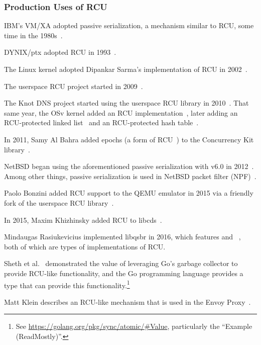 \subsubsection{Production Uses of RCU}
\label{sec:defer:Production Uses of RCU}

IBM's VM/XA adopted passive serialization, a mechanism similar to
RCU, some time in the 1980s~\cite{Hennessy89}.

DYNIX/ptx adopted RCU in 1993~\cite{McKenney98,Slingwine95}.

The Linux kernel adopted Dipankar Sarma's implementation of RCU in
2002~\cite{Torvalds2.5.43}.

The userspace RCU project started in 2009~\cite{MathieuDesnoyers2009URCU}.

The Knot DNS project started using the userspace RCU
library in 2010~\cite{LubosSlovak2010KnotDNSRCU}.
That same year, the OSv kernel added an RCU
implementation~\cite{AviKivity2013OSvRCU},
later adding an RCU-protected linked list~\cite{AviKivity2013OSvRCUlist}
and an RCU-protected hash table~\cite{AviKivity2013OSvRCUhash}.

In 2011, Samy Al Bahra added epochs
(a form of RCU~\cite{UCAM-CL-TR-579,KeirFraser2007withoutLocks})
to the Concurrency Kit
library~\cite{SamyAlBahra2011ckEpoch}.

NetBSD began using the aforementioned passive serialization with v6.0 in
2012~\cite{NetBSD2012pserialize}.
Among other things, passive serialization is used in
NetBSD packet filter (NPF)~\cite{MindaugasRasiukevicius2014NPFRCU}.

Paolo Bonzini added RCU support to the QEMU emulator in 2015 via a
friendly fork of the userspace RCU
library~\cite{MikeDay2013RCUqemu,PaoloBonzini2013QEMURCU}.

In 2015, Maxim Khizhinsky added RCU to
libcds~\cite{MaxKhiszinsky2015C++RCU}.

Mindaugas Rasiukevicius implemented libqsbr in 2016, which features
 and ~\cite{MindaugasRasiukevicius2016libqsbr},
both of which are types of implementations of RCU\@.

Sheth et al.~\cite{HarshalSheth2016goRCU}
demonstrated the value of leveraging Go's garbage
collector to provide RCU-like functionality, and
the Go programming language provides a  type that can
provide this functionality.\footnote{
	See \url{https://golang.org/pkg/sync/atomic/\#Value}, particularly
	the ``Example (ReadMostly)''.}

Matt Klein describes an RCU-like mechanism that is used in the Envoy
Proxy~\cite{MattKlein2017EnvoyRCU}.


